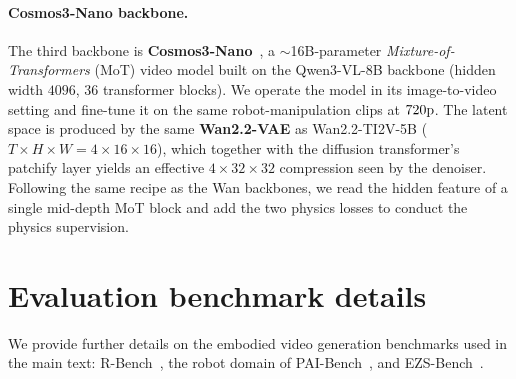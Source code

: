 \paragraph{Cosmos3-Nano backbone.}
The third backbone is \textbf{Cosmos3-Nano}~\cite{nvidia2026worldsimulationvideofoundation}, a $\sim$16B-parameter
\emph{Mixture-of-Transformers} (MoT) video model built on the Qwen3-VL-8B
backbone (hidden width $4096$, $36$ transformer blocks). We operate
the model in its image-to-video setting and fine-tune it on the same
robot-manipulation clips at $720{\rm p}$. The latent space is produced by the same
\textbf{Wan2.2-VAE} as Wan2.2-TI2V-5B ($T{\times}H{\times}W = 4{\times}16{\times}16$),
which together with the diffusion transformer's patchify layer yields an effective
$4{\times}32{\times}32$ compression seen by the denoiser. Following the same recipe as the Wan backbones, we read the hidden
feature of a single mid-depth MoT block and add the two physics losses to conduct the physics supervision.

\section{Evaluation benchmark details}
\label{appx:benchmarks}

We provide further details on the embodied video generation benchmarks used in the main
text: R-Bench~\cite{deng2026rethinking}, the robot domain of
PAI-Bench~\cite{zhou2025paibench}, and EZS-Bench~\cite{ali2025abot}.

